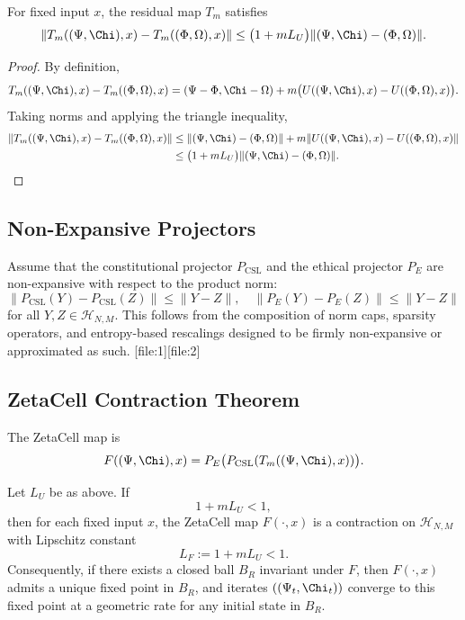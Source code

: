 \documentclass[11pt]{article}
\begin{document}
\begin{lemma}
For fixed input $x$, the residual map $T_m$ satisfies
\[
  \|T_m((\Psi,\Chi),x) - T_m((\Phi,\Omega),x)\|
  \le \bigl(1 + m L_U\bigr)
       \|(\Psi,\Chi) - (\Phi,\Omega)\|.
\]
\end{lemma}

\begin{proof}
By definition,
\[
  T_m((\Psi,\Chi),x) - T_m((\Phi,\Omega),x)
  = (\Psi - \Phi, \Chi - \Omega)
    + m \bigl(U((\Psi,\Chi),x) - U((\Phi,\Omega),x)\bigr).
\]
Taking norms and applying the triangle inequality,
\begin{align*}
 \|T_m((\Psi,\Chi),x) - T_m((\Phi,\Omega),x)\|
 &\le \|(\Psi,\Chi) - (\Phi,\Omega)\|
      + m \|U((\Psi,\Chi),x) - U((\Phi,\Omega),x)\| \\
 &\le \bigl(1 + m L_U\bigr) \|(\Psi,\Chi) - (\Phi,\Omega)\|.
\end{align*}
\end{proof}

\subsection{Non-Expansive Projectors}

Assume that the constitutional projector $P_{\mathrm{CSL}}$ and the
ethical projector $P_E$ are non-expansive with respect to the product
norm:
\[
  \|P_{\mathrm{CSL}}(Y) - P_{\mathrm{CSL}}(Z)\| \le \|Y - Z\|,
  \quad
  \|P_E(Y) - P_E(Z)\| \le \|Y - Z\|
\]
for all $Y,Z \in \mathcal{H}_{N,M}$. This follows from the composition
of norm caps, sparsity operators, and entropy-based rescalings designed
to be firmly non-expansive or approximated as such.%
[file:1][file:2]

\subsection{ZetaCell Contraction Theorem}

The ZetaCell map is
\[
  F((\Psi,\Chi),x) =
  P_E\bigl(P_{\mathrm{CSL}}(T_m((\Psi,\Chi),x))\bigr).
\]

\begin{theorem}
Let $L_U$ be as above. If
\[
  1 + m L_U < 1,
\]
then for each fixed input $x$, the ZetaCell map $F(\cdot,x)$ is a
contraction on $\mathcal{H}_{N,M}$ with Lipschitz constant
\[
  L_F := 1 + m L_U < 1.
\]
Consequently, if there exists a closed ball $B_R$ invariant under $F$,
then $F(\cdot,x)$ admits a unique fixed point in $B_R$, and iterates
$((\Psi_t,\Chi_t))$ converge to this fixed point at a geometric rate
for any initial state in $B_R$.
\end{theorem}
\end{document}
